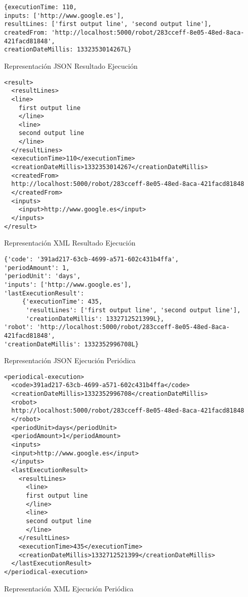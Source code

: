 \begin{table}
\begin{verbatim}
{executionTime: 110,
inputs: ['http://www.google.es'],
resultLines: ['first output line', 'second output line'],
createdFrom: 'http://localhost:5000/robot/283cceff-8e05-48ed-8aca-421facd81848',
creationDateMillis: 1332353014267L}
\end{verbatim}
\caption{Representación JSON Resultado Ejecución}
\label{execution_json_representation}
\end{table}

\begin{table}
\begin{verbatim}
<result>
  <resultLines>
  <line>
    first output line
    </line>
    <line>
    second output line
    </line>
  </resultLines>
  <executionTime>110</executionTime>
  <creationDateMillis>1332353014267</creationDateMillis>
  <createdFrom>
  http://localhost:5000/robot/283cceff-8e05-48ed-8aca-421facd81848
  </createdFrom>
  <inputs>
    <input>http://www.google.es</input>
  </inputs>
</result>
\end{verbatim}
\caption{Representación XML Resultado Ejecución}
\label{execution_xml_representation}
\end{table}

\begin{table}
\begin{verbatim}
{'code': '391ad217-63cb-4699-a571-602c431b4ffa',
'periodAmount': 1,
'periodUnit': 'days',
'inputs': ['http://www.google.es'],
'lastExecutionResult':
     {'executionTime': 435,
      'resultLines': ['first output line', 'second output line'],
      'creationDateMillis': 1332712521399L},
'robot': 'http://localhost:5000/robot/283cceff-8e05-48ed-8aca-421facd81848',
'creationDateMillis': 1332352996708L}
\end{verbatim}
\caption{Representación JSON Ejecución Periódica}
\label{periodical_execution_json_representation}
\end{table}

\begin{table}
\begin{verbatim}
<periodical-execution>
  <code>391ad217-63cb-4699-a571-602c431b4ffa</code>
  <creationDateMillis>1332352996708</creationDateMillis>
  <robot>
  http://localhost:5000/robot/283cceff-8e05-48ed-8aca-421facd81848
  </robot>
  <periodUnit>days</periodUnit>
  <periodAmount>1</periodAmount>
  <inputs>
  <input>http://www.google.es</input>
  </inputs>
  <lastExecutionResult>
    <resultLines>
      <line>
      first output line
      </line>
      <line>
      second output line
      </line>
    </resultLines>
    <executionTime>435</executionTime>
    <creationDateMillis>1332712521399</creationDateMillis>
  </lastExecutionResult>
</periodical-execution>
\end{verbatim}
\caption{Representación XML Ejecución Periódica}
\label{periodical_execution_xml_representation}
\end{table}
\newpage

